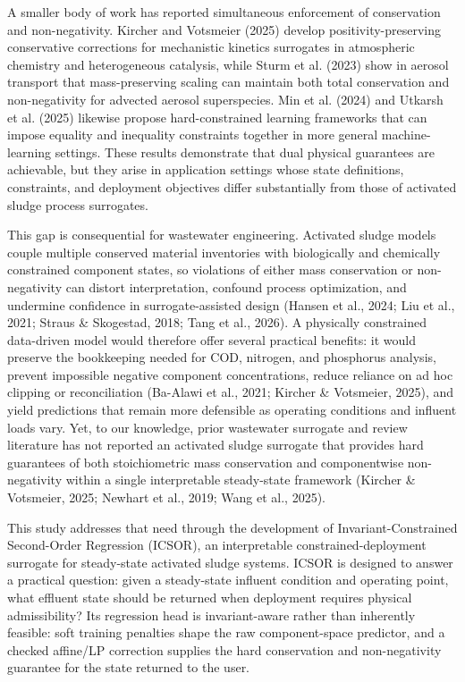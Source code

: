 \documentclass[a4paper,fleqn]{cas-sc}
\newenvironment{currentrevblock}{\begingroup\color{currentRevisionBlue}}{\endgroup}
\newenvironment{currentrevblock}{}{}
\newenvironment{revblock}{}{}
\begin{document}
\begin{revblock}
A smaller body of work has reported simultaneous enforcement of conservation and non-negativity. Kircher and Votsmeier (2025) develop positivity-preserving conservative corrections for mechanistic kinetics surrogates in atmospheric chemistry and heterogeneous catalysis, while Sturm et al. (2023) show in aerosol transport that mass-preserving scaling can maintain both total conservation and non-negativity for advected aerosol superspecies. Min et al. (2024) and Utkarsh et al. (2025) likewise propose hard-constrained learning frameworks that can impose equality and inequality constraints together in more general machine-learning settings. These results demonstrate that dual physical guarantees are achievable, but they arise in application settings whose state definitions, constraints, and deployment objectives differ substantially from those of activated sludge process surrogates.

This gap is consequential for wastewater engineering. Activated sludge models couple multiple conserved material inventories with biologically and chemically constrained component states, so violations of either mass conservation or non-negativity can distort interpretation, confound process optimization, and undermine confidence in surrogate-assisted design (Hansen et al., 2024; Liu et al., 2021; Straus \& Skogestad, 2018; Tang et al., 2026). A physically constrained data-driven model would therefore offer several practical benefits: it would preserve the bookkeeping needed for COD, nitrogen, and phosphorus analysis, prevent impossible negative component concentrations, reduce reliance on ad hoc clipping or reconciliation (Ba-Alawi et al., 2021; Kircher \& Votsmeier, 2025), and yield predictions that remain more defensible as operating conditions and influent loads vary. Yet, to our knowledge, prior wastewater surrogate and review literature has not reported an activated sludge surrogate that provides hard guarantees of both stoichiometric mass conservation and componentwise non-negativity within a single interpretable steady-state framework (Kircher \& Votsmeier, 2025; Newhart et al., 2019; Wang et al., 2025).

\begin{currentrevblock}
This study addresses that need through the development of Invariant-Constrained Second-Order Regression (ICSOR), an interpretable constrained-deployment surrogate for steady-state activated sludge systems. ICSOR is designed to answer a practical question: given a steady-state influent condition and operating point, what effluent state should be returned when deployment requires physical admissibility? Its regression head is invariant-aware rather than inherently feasible: soft training penalties shape the raw component-space predictor, and a checked affine/LP correction supplies the hard conservation and non-negativity guarantee for the state returned to the user.
\end{currentrevblock}


\end{revblock}
\end{document}
